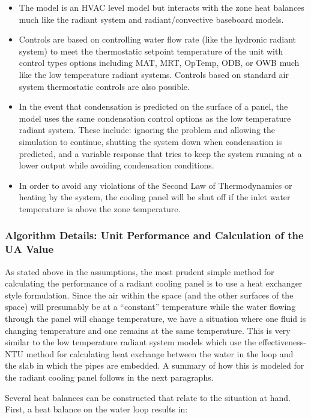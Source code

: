 {\begin{itemize}
\item
  The model is an HVAC level model but interacts with the zone heat balances much like the radiant system and radiant/convective baseboard models.
\item
  Controls are based on controlling water flow rate (like the hydronic radiant system) to meet the thermostatic setpoint temperature of the unit with control types options including MAT, MRT, OpTemp, ODB, or OWB much like the low temperature radiant systems.  Controls based on standard air system thermostatic controls are also possible.
\item
  In the event that condensation is predicted on the surface of a panel, the model uses the same condensation control options as the low temperature radiant system.  These include: ignoring the problem and allowing the simulation to continue, shutting the system down when condensation is predicted, and a variable response that tries to keep the system running at a lower output while avoiding condensation conditions.
\item
  In order to avoid any violations of the Second Law of Thermodynamics or heating by the system, the cooling panel will be shut off if the inlet water temperature is above the zone temperature.
\end{itemize}

\subsubsection{Algorithm Details: Unit Performance and Calculation of the UA Value}\label{algorithm-details-unit-performance-and-calculation-of-the-ua-value}

As stated above in the assumptions, the most prudent simple method for calculating the performance of a radiant cooling panel is to use a heat exchanger style formulation.  Since the air within the space (and the other surfaces of the space) will presumably be at a “constant” temperature while the water flowing through the panel will change temperature, we have a situation where one fluid is changing temperature and one remains at the same temperature.  This is very similar to the low temperature radiant system models which use the effectiveness-NTU method for calculating heat exchange between the water in the loop and the slab in which the pipes are embedded.  A summary of how this is modeled for the radiant cooling panel follows in the next paragraphs.

Several heat balances can be constructed that relate to the situation at hand.  First, a heat balance on the water loop results in:

}
